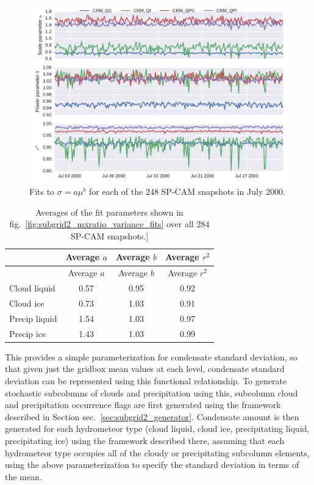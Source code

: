 \begin{figure}[htbp]
\centering
\includegraphics{graphics/subgrid2_mxratio_variance_fits.pdf}
\caption{\label{fig:subgrid2_mxratio_variance_fits}Fits to
\(\sigma = a \mu^b\) for each of the 248 SP-CAM snapshots in July
2000.}\label{fig:subgrid2ux5fmxratioux5fvarianceux5ffits}
\end{figure}

\begin{longtable}[]{@{}lccc@{}}
\caption{\label{tbl:subgrid2_mxratio_variance_fits_table}Averages of the
fit parameters shown in fig.~\ref{fig:subgrid2_mxratio_variance_fits}
over all 284 SP-CAM snapshots.{]} }\tabularnewline
\toprule
& Average \(a\) & Average \(b\) & Average \(r^2\)\tabularnewline
\midrule
\endfirsthead
\toprule
& Average \(a\) & Average \(b\) & Average \(r^2\)\tabularnewline
\midrule
\endhead
Cloud liquid & 0.57 & 0.95 & 0.92\tabularnewline
Cloud ice & 0.73 & 1.03 & 0.91\tabularnewline
Precip liquid & 1.54 & 1.03 & 0.97\tabularnewline
Precip ice & 1.43 & 1.03 & 0.99\tabularnewline
\bottomrule
\end{longtable}

This provides a simple parameterization for condensate standard
deviation, so that given just the gridbox mean values at each level,
condensate standard deviation can be represented using this functional
relationship. To generate stochastic subcolumns of clouds and
precipitation using this, subcolumn cloud and precipitation occurrence
flags are first generated using the framework described in Section
sec.~\ref{sec:subgrid2_generator}. Condensate amount is then generated
for each hydrometeor type (cloud liquid, cloud ice, precipitating
liquid, precipitating ice) using the framework described there, assuming
that each hydrometeor type occupies all of the cloudy or precipitating
subcolumn elements, using the above parameterization to specify the
standard deviation in terms of the mean.

